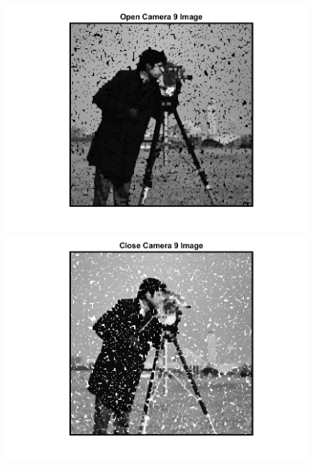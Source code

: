 \documentclass[11pt]{article} %
\begin{document}
\begin{figure}
 \centering
	\includegraphics{2ac.png}
	\includegraphics{2ad.png}
\end{figure}
\end{document}
